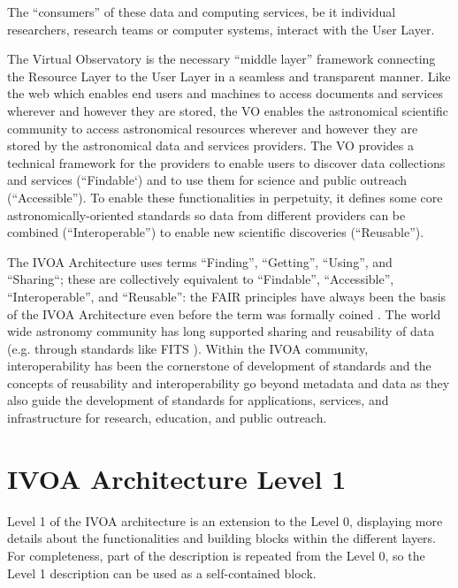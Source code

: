 \documentclass[11pt,a4paper]{ivoa}
\begin{document}
The ``consumers'' of these data and computing services, be it individual researchers, 
research teams or computer systems, interact with the User Layer. 

The Virtual Observatory is the necessary ``middle layer'' framework connecting the 
Resource Layer to the User Layer in a seamless and transparent manner. Like the web 
which enables end  users and machines to access documents and services 
wherever and however they are stored, the VO enables the astronomical scientific
community to access astronomical resources wherever and however they are stored by 
the astronomical data and services providers. The VO provides a technical framework 
for the providers to enable users to discover data collections and services 
(``Findable`) and to use them for science and public outreach (``Accessible''). To 
enable these functionalities in perpetuity, it defines some core astronomically-oriented 
standards so data from different providers can be combined (``Interoperable'') to enable
new scientific discoveries (``Reusable'').

The IVOA Architecture uses terms ``Finding'', ``Getting'', ``Using'', and ``Sharing``;
these are collectively equivalent to ``Findable'', ``Accessible'', ``Interoperable'', and
``Reusable'': the FAIR principles have always been the basis of the IVOA Architecture
even before the term was formally coined \citep{Wilkinson2016}. The world wide
astronomy community has long supported sharing and reusability of data (e.g. through standards 
like FITS \citep{std:FITS}). Within the IVOA community, interoperability has been the cornerstone
of development of standards and the concepts of reusability and interoperability go beyond 
metadata and data as they also guide the development of standards for applications, services, 
and infrastructure for research, education, and public outreach.

\section{IVOA Architecture Level 1}

Level 1 of the IVOA architecture is an extension to the Level 0, displaying more 
details about the functionalities and building blocks within the different layers. 
For completeness, part of the description is repeated  from  the  Level 0, so the  
Level 1 description can be used as a self-contained block.
\end{document}
